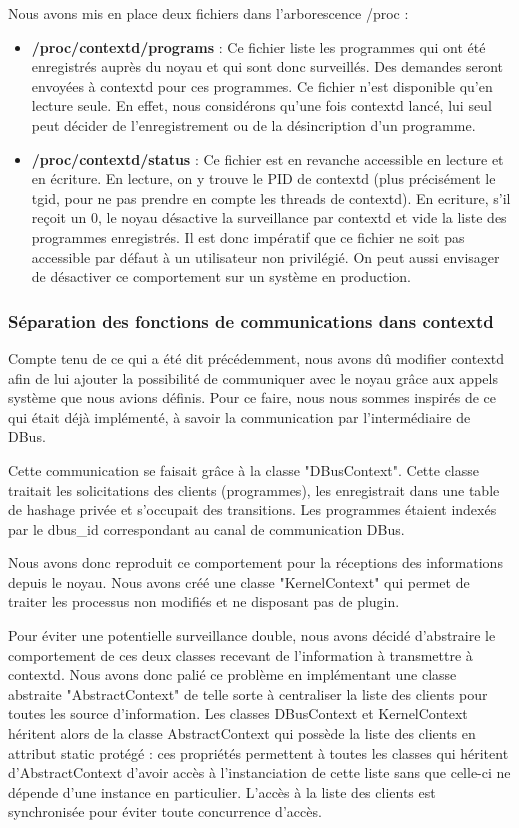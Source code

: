 \documentclass[pdftex,a4paper,titlepage,11pt]{article}
\begin{document}
Nous avons mis en place deux fichiers dans l'arborescence /proc :

	\begin{itemize}
		\item \textbf{/proc/contextd/programs} : Ce fichier liste les programmes qui ont été enregistrés auprès du noyau et qui sont donc surveillés. Des demandes seront envoyées à contextd pour ces programmes. Ce fichier n'est disponible qu'en lecture seule. En effet, nous considérons qu'une fois contextd lancé, lui seul peut décider de l'enregistrement ou de la désincription d'un programme.
		\item \textbf{/proc/contextd/status} : Ce fichier est en revanche accessible en lecture et en écriture. En lecture, on y trouve le PID de contextd (plus précisément le tgid, pour ne pas prendre en compte les threads de contextd). En ecriture, s'il reçoit un 0, le noyau désactive la surveillance par contextd et vide la liste des programmes enregistrés. Il est donc impératif que ce fichier ne soit pas accessible par défaut à un utilisateur non privilégié. On peut aussi envisager de désactiver ce comportement sur un système en production.
	\end{itemize}

\subsubsection{Séparation des fonctions de communications dans contextd}

Compte tenu de ce qui a été dit précédemment, nous avons dû modifier contextd afin de lui ajouter la possibilité de communiquer avec le noyau grâce aux appels système que nous avions définis. Pour ce faire, nous nous sommes inspirés de ce qui était déjà implémenté, à savoir la communication par l'intermédiaire de DBus.

Cette communication se faisait grâce à la classe "DBusContext". Cette classe traitait les solicitations des clients (programmes), les enregistrait dans une table de hashage privée et s'occupait des transitions. Les programmes étaient indexés par le dbus\_id correspondant au canal de communication DBus.

Nous avons donc reproduit ce comportement pour la réceptions des informations depuis le noyau. Nous avons créé une classe "KernelContext" qui permet de traiter les processus non modifiés et ne disposant pas de plugin.

Pour éviter une potentielle surveillance double, nous avons décidé d'abstraire le comportement de ces deux classes recevant de l'information à transmettre à contextd. Nous avons donc palié ce problème en implémentant une classe abstraite "AbstractContext" de telle sorte à centraliser la liste des clients pour toutes les source d'information. Les classes DBusContext et KernelContext héritent alors de la classe AbstractContext qui possède la liste des clients en attribut static protégé : ces propriétés permettent à toutes les classes qui héritent d'AbstractContext d'avoir accès à l'instanciation de cette liste sans que celle-ci ne dépende d'une instance en particulier. L'accès à la liste des clients est synchronisée pour éviter toute concurrence d'accès.
\end{document}
